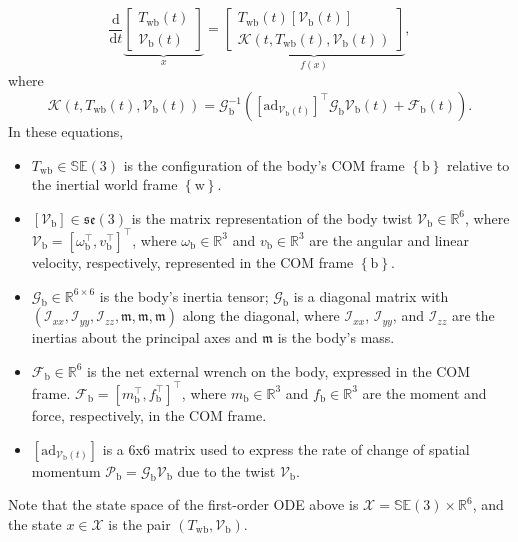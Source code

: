 \documentclass[]{article}
\theoremstyle{definition}
\theoremstyle{remark}
\begin{document}
\begin{equation}\label{eq:first_order_state_space_dynamics}
\frac{\mathrm{d}}{\mathrm{d}t}
\underbrace{
\begin{bmatrix}
T_\mathrm{wb}(t)\\
\mathcal{V}_\mathrm{b}(t)
\end{bmatrix}}_{x}
=
\underbrace{\begin{bmatrix}
T_\mathrm{wb}(t)\left[\mathcal{V}_\mathrm{b}(t)\right]\\
\mathcal{K}\left(t,T_\mathrm{wb}(t),\mathcal{V}_\mathrm{b}(t)\right)
\end{bmatrix}}_{f(x)},
\end{equation}
where
\begin{equation}
\mathcal{K}\left(t,T_\mathrm{wb}(t),\mathcal{V}_\mathrm{b}(t)\right) = \mathcal{G}_\mathrm{b}^{-1}\left(\left[\mathrm{ad}_{\mathcal{V}_\mathrm{b}(t)}\right]^{\top}\mathcal{G}_\mathrm{b}\mathcal{V}_\mathrm{b}(t) + \mathcal{F}_\mathrm{b}(t)\right).
\end{equation}
In these equations,
\begin{itemize}
	\item $T_\mathrm{wb}\in \mathbb{SE}(3)$ is the configuration of the body's COM frame $\left\{\mathrm{b}\right\}$ relative to the inertial world frame $\left\{\mathrm{w}\right\}$.
	\item $\left[\mathcal{V}_\mathrm{b}\right]\in\mathfrak{se}(3)$ is the matrix representation of the body twist $\mathcal{V}_\mathrm{b}\in\mathbb{R}^6$, where $\mathcal{V}_\mathrm{b} = \left[\omega_\mathrm{b}^{\top},v_\mathrm{b}^{\top}\right]^{\top}$, where $\omega_\mathrm{b}\in\mathbb{R}^3$ and $v_\mathrm{b}\in\mathbb{R}^3$ are the angular and linear velocity, respectively, represented in the COM frame $\left\{\mathrm{b}\right\}$.
	\item $\mathcal{G}_\mathrm{b}\in\mathbb{R}^{6\times6}$ is the body's inertia tensor; $\mathcal{G}_\mathrm{b}$ is a diagonal matrix with $\left(\mathcal{I}_{xx},\mathcal{I}_{yy},\mathcal{I}_{zz},\mathfrak{m},\mathfrak{m},\mathfrak{m}\right)$ along the diagonal, where $\mathcal{I}_{xx}$, $\mathcal{I}_{yy}$, and $\mathcal{I}_{zz}$ are the inertias about the principal axes and $\mathfrak{m}$ is the body's mass.
	\item $\mathcal{F}_\mathrm{b}\in\mathbb{R}^6$ is the net external wrench on the body, expressed in the COM frame. $\mathcal{F}_\mathrm{b} = \left[m_\mathrm{b}^{\top},f_\mathrm{b}^{\top}\right]^{\top}$, where $m_\mathrm{b}\in\mathbb{R}^3$ and $f_\mathrm{b}\in\mathbb{R}^3$ are the moment and force, respectively, in the COM frame.
	\item $\left[\mathrm{ad}_{\mathcal{V}_\mathrm{b}(t)}\right]$ is a 6x6 matrix used to express the rate of change of spatial momentum $\mathcal{P}_\mathrm{b} = \mathcal{G}_\mathrm{b}\mathcal{V}_\mathrm{b}$ due to the twist $\mathcal{V}_\mathrm{b}$.
\end{itemize}
Note that the state space of the first-order \ac{ODE} above is $\mathcal{X} = \mathbb{SE}(3)\times\mathbb{R}^6$, and the state $x\in\mathcal{X}$ is the pair $\left(T_\mathrm{wb},\mathcal{V}_\mathrm{b}\right)$.
\end{document}
